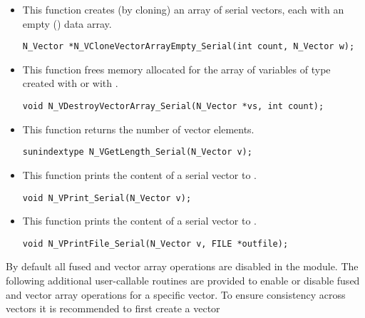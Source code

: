 \begin{itemize}
\item {}

 This function creates (by cloning) an array of  serial vectors, each with an
 empty () data array.

 

 \verb|N_Vector *N_VCloneVectorArrayEmpty_Serial(int count, N_Vector w);|


\item {}

 This function frees memory allocated for the array of  variables of type
  created with  or with
 .

 

 \verb|void N_VDestroyVectorArray_Serial(N_Vector *vs, int count);|


\item {}

 This function returns the number of vector elements.

 
 
 \verb|sunindextype N_VGetLength_Serial(N_Vector v);|


\item {}

 This function prints the content of a serial vector to .
 
 \verb|void N_VPrint_Serial(N_Vector v);|


\item {}

 This function prints the content of a serial vector to .
 
 \verb|void N_VPrintFile_Serial(N_Vector v, FILE *outfile);|

\end{itemize}
By default all fused and vector array operations are disabled in the {\nvecs}
module. The following additional user-callable routines are provided to
enable or disable fused and vector array operations for a specific vector. To
ensure consistency across vectors it is recommended to first create a vector
